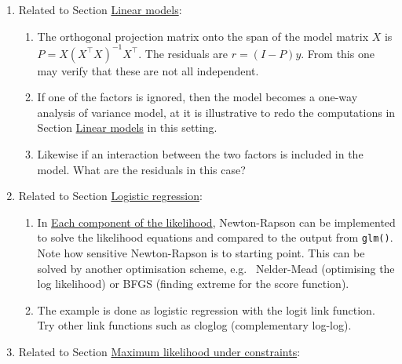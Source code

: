 \begin{enumerate}
\def\labelenumi{\arabic{enumi}.}
\tightlist
\item
  Related to Section \protect\hyperlink{linear-models}{Linear models}:

  \begin{enumerate}
  \def\labelenumii{\alph{enumii})}
  \tightlist
  \item
    The orthogonal projection
    matrix onto the span of the model matrix \(X\) is \(P=X (X^\top X)^{-1}X^\top\). The residuals are \(r=(I-P)y\). From this one may
    verify that these are not all independent.
  \item
    If one of the factors
    is ignored, then the model becomes a one-way analysis of variance
    model, at it is illustrative to redo the computations in Section
    \protect\hyperlink{linear-models}{Linear models} in this setting.
  \item
    Likewise if an interaction between the two factors
    is included in the model. What are the residuals in this case?
  \end{enumerate}
\item
  Related to Section \protect\hyperlink{logistic-regression}{Logistic regression}:

  \begin{enumerate}
  \def\labelenumii{\alph{enumii})}
  \tightlist
  \item
    In \protect\hyperlink{each-component-of-the-likelihood}{Each component of the
    likelihood}, Newton-Rapson can be implemented to solve the likelihood
    equations and compared to the output from \texttt{glm()}.
    Note how sensitive Newton-Rapson is to starting point.
    This can be solved by another optimisation scheme, e.g.~
    Nelder-Mead (optimising the log likelihood) or BFGS
    (finding extreme for the score function).
  \item
    The example is done as logistic regression with the logit
    link function. Try other link functions such as cloglog (complementary log-log).
  \end{enumerate}
\item
  Related to Section \protect\hyperlink{maximum-likelihood-under-constraints}{Maximum likelihood under constraints}:


\end{enumerate}
